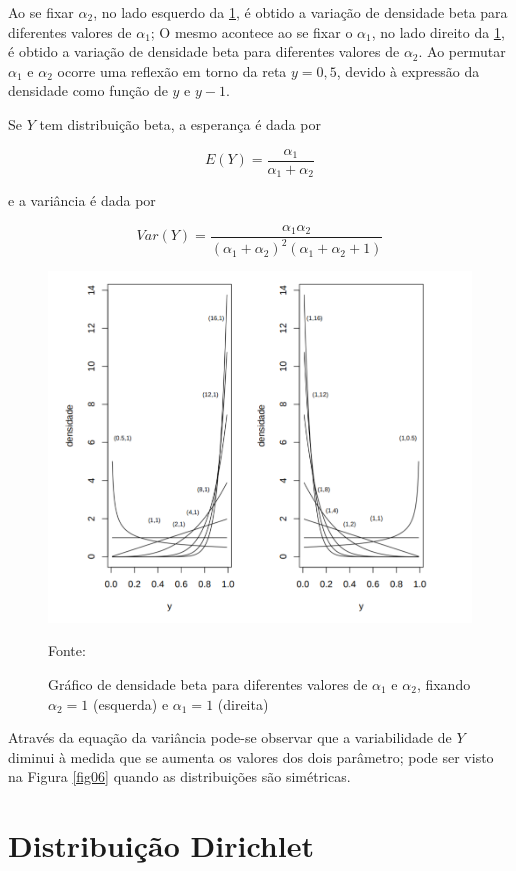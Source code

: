 Ao se fixar $\alpha_2$, no lado esquerdo da \ref{fig07}, é obtido a variação de densidade beta para diferentes valores de $\alpha_1$; O mesmo acontece ao se fixar o $\alpha_1$, no lado direito da \ref{fig07}, é obtido a variação de densidade beta para diferentes valores de $\alpha_2$. Ao permutar $\alpha_1$ e $\alpha_2$ ocorre uma reflexão em torno da reta $y = 0,5$, devido à expressão da densidade como função de $y$ e $y-1$. 

Se $Y$ tem distribuição beta, a esperança é dada por

$$ E(Y) = \frac {\alpha_1}{\alpha_1 + \alpha_2} $$

e a variância é dada por

$$ Var(Y) = \frac{\alpha_1\alpha_2}{(\alpha_1+\alpha_2)^2(\alpha_1+\alpha_2+1)} $$


\begin{figure}[!h]
	\centering
	\includegraphics[keepaspectratio=true,scale=0.4]{figuras/dist-beta2.png}
	\caption{Gráfico de densidade beta para diferentes valores de $\alpha_1$ e $\alpha_2$, fixando $\alpha_2 = 1$ (esquerda) e $\alpha_1 = 1$ (direita)}
	Fonte: \cite{gomes2005}
	\label{fig07}
\end{figure}


Através da equação da variância pode-se observar que a variabilidade de $Y$ diminui à medida que se aumenta os valores dos dois parâmetro; pode ser visto na Figura \ref{fig06} quando as distribuições são simétricas.


\section{Distribuição Dirichlet}


